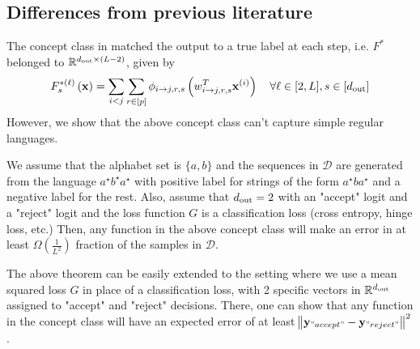 \subsection{Differences from previous literature}
The concept class in \cite{allen2019can} matched the output to a true label at each step, i.e. $F^{\ast}$ belonged to $\mathbb{R}^{d_{\mathrm{out}}  \times (L-2)}$, given by
\begin{equation*}
	F^{\ast (\ell)}_s\left(\mathbf{x}\right) = \sum_{i < j} \sum_{r \in [p]} \phi_{i \to j, r, s} \left(w_{i \to j, r, s}^T \mathbf{x}^{(i)}\right) \quad \forall \ell \in [2, L], s \in [d_{\mathrm{out}} ]
\end{equation*}
However, we show that the above concept class can't capture simple regular languages.
\begin{theorem}
	We assume that the alphabet set is $\{a, b\}$ and the sequences in $\mathcal{D}$ are generated from the language $a^{\star}b^{\star}a^{\star}$ with positive label for strings of the form $a^{\star} b a^{\star}$ and a negative label for the rest. Also, assume that $d_{\mathrm{out}} =2$ with an "accept" logit and a "reject" logit and the loss function $G$ is a classification loss (cross entropy, hinge loss, etc.) Then, any function in the above concept class will make an error in at least $\Omega(\frac{1}{L^2})$ fraction of the samples in $\mathcal{D}$.
\end{theorem}
The above theorem can be easily extended to the setting where we use a mean squared loss $G$ in place of a classification loss, with 2 specific vectors in $\mathbb{R}^{d_{\mathrm{out}} }$ assigned to "accept" and "reject" decisions. There, one can show that any function in the concept class will have an expected error of at least $\norm{\mathbf{y}_{"accept"} - \mathbf{y}_{"reject"}}^2$.


